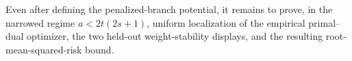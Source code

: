 Even after defining the penalized-branch potential, it remains to prove, in the narrowed regime \(a<2t(2s+1)\), uniform localization of the empirical primal--dual optimizer, the two held-out weight-stability displays, and the resulting root-mean-squared-risk bound.